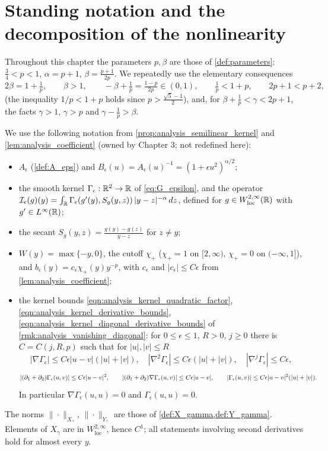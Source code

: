 
\section{Standing notation and the decomposition of the nonlinearity}

Throughout this chapter the parameters $p,\beta$ are those of \cref{def:parameters}:
$\tfrac34<p<1$, $\alpha=p+1$, $\beta=\tfrac{p+1}{2p}$. We repeatedly use the elementary
consequences
\begin{equation}\label{eq:c10_parameter_facts}
  2\beta = 1+\tfrac1p,\qquad \beta>1,\qquad -\beta+\tfrac1p=\tfrac{1-p}{2p}\in(0,1),\qquad
  \tfrac1p<1+p,\qquad 2p+1<p+2,
\end{equation}
(the inequality $1/p<1+p$ holds since $p>\frac{\sqrt5-1}{2}$), and, for
$\beta+\frac1p<\gamma<2p+1$, the facts $\gamma>1$, $\gamma>p$ and $\gamma-\frac1p>\beta$.

We use the following notation from \cref{prop:analysis_semilinear_kernel} and
\cref{lem:analysis_coefficient} (owned by Chapter 3; not redefined here):
\begin{itemize}
  \item $A_\epsilon$ (\cref{def:A_eps}) and $B_\epsilon(u)=A_\epsilon(u)^{-1}=(1+\epsilon u^2)^{\alpha/2}$;
  \item the smooth kernel $\Gamma_\epsilon:\mathbb{R}^2\to\mathbb{R}$ of \eqref{eq:G_epsilon}, and the operator
    $\mathcal{I}_\epsilon(g)(y)=\int_{\mathbb{R}} \Gamma_\epsilon(g'(y),S_g(y,z))\,|y-z|^{-\alpha}\,dz$, defined for
    $g\in W^{2,\infty}_{\mathrm{loc}}(\mathbb{R})$ with $g'\in L^\infty(\mathbb{R})$;
  \item the secant $S_g(y,z)=\frac{g(y)-g(z)}{y-z}$ for $z\neq y$;
  \item $W(y)=\max\{-y,0\}$, the cutoff $\chi_+$ ($\chi_+=1$ on $[2,\infty)$, $\chi_+=0$ on $(-\infty,1]$),
    and $b_\epsilon(y)=c_\epsilon\chi_+(y)y^{-p}$, with $c_\epsilon$ and $|c_\epsilon|\le C\epsilon$ from
    \cref{lem:analysis_coefficient};
  \item the kernel bounds \eqref{eqn:analysis_kernel_quadratic_factor},
    \eqref{eqn:analysis_kernel_derivative_bounds},
    \eqref{eqn:analysis_kernel_diagonal_derivative_bounds} of \cref{rmk:analysis_vanishing_diagonal}:
    for $0\le\epsilon\le1$, $R>0$, $j\ge0$ there is $C=C(j,R,p)$ such that for $|u|,|v|\le R$
    \[
      |\nabla\Gamma_\epsilon|\le C\epsilon|u-v|(|u|+|v|),\quad
      |\nabla^2\Gamma_\epsilon|\le C\epsilon(|u|+|v|),\quad
      |\nabla^j\Gamma_\epsilon|\le C\epsilon,
    \]
    \[
      |(\partial_1+\partial_2)\Gamma_\epsilon(u,v)|\le C\epsilon|u-v|^2,\qquad
      |(\partial_1+\partial_2)\nabla\Gamma_\epsilon(u,v)|\le C\epsilon|u-v|,\qquad
      |\Gamma_\epsilon(u,v)|\le C\epsilon|u-v|^2(|u|+|v|).
    \]
    In particular $\nabla\Gamma_\epsilon(u,u)=0$ and $\Gamma_\epsilon(u,u)=0$.
\end{itemize}
The norms $\|\cdot\|_{X_\gamma}$, $\|\cdot\|_{Y_\gamma}$ are those of \cref{def:X_gamma,def:Y_gamma}.
Elements of $X_\gamma$ are in $W^{2,\infty}_{\mathrm{loc}}$, hence $C^1$; all statements involving
second derivatives hold for almost every $y$.

